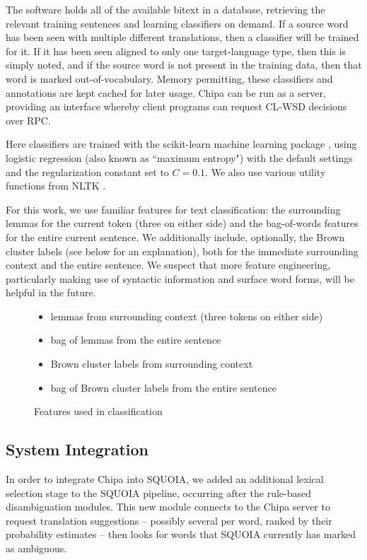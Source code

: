 \documentclass[10pt, a4paper]{article}
\begin{document}
The software holds all of the available bitext in a database, retrieving the
relevant training sentences and learning classifiers on demand.
If a source word has been seen with multiple different translations, then a
classifier will be trained for it. If it has been seen aligned to only one
target-language type, then this is simply noted, and if the source word is not
present in the training data, then that word is marked out-of-vocabulary.
Memory permitting, these classifiers and annotations are kept cached for later
usage. Chipa can be run as a server, providing an interface whereby client
programs can request CL-WSD decisions over RPC.

Here classifiers are trained with the scikit-learn machine learning package
\cite{scikit-learn}, using logistic regression (also known as ``maximum
entropy") with the default settings and the regularization constant set to
$C=0.1$. We also use various utility functions from NLTK \cite{nltkbook}. 

For this work, we use familiar features for text classification: the
surrounding lemmas for the current token (three on either side) and the
bag-of-words features for the entire current sentence. We additionally include,
optionally, the Brown cluster labels (see below for an explanation),
both for the immediate surrounding context and the entire sentence.
We suspect that more feature engineering, particularly making use of syntactic
information and surface word forms, will be helpful in the future.

\begin{figure}[t!]
  \begin{itemize}
    \item lemmas from surrounding context (three tokens on either side)
    \item bag of lemmas from the entire sentence
    \item Brown cluster labels from surrounding context
    \item bag of Brown cluster labels from the entire sentence
  \end{itemize}
\caption{Features used in classification}
\label{fig:features}
\end{figure}

\subsection{System Integration}
In order to integrate Chipa into SQUOIA, we added an additional lexical
selection stage to the SQUOIA pipeline, occurring after the rule-based
disambiguation modules. This new module connects to the Chipa server to request
translation suggestions -- possibly several per word, ranked by their
probability estimates -- then looks for words that SQUOIA currently has marked
as ambiguous.
\end{document}
